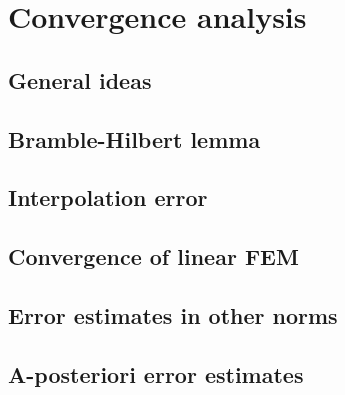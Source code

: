 \section{Convergence analysis}


\subsection{General ideas}


\subsection{Bramble-Hilbert lemma}


\subsection{Interpolation error}


\subsection{Convergence of linear FEM}


\subsection{Error estimates in other norms}


\subsection{A-posteriori error estimates}
